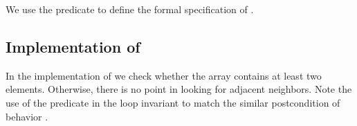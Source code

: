 We use the predicate 
to define the formal specification
of .



\subsection{Implementation of \adjacentfind}

In the implementation of  we check whether the array
contains at least two elements.
Otherwise, there is no point in looking for adjacent neighbors.
Note the use of the predicate 
 in the loop invariant to
match the similar postcondition of behavior .



